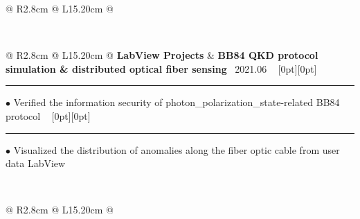 {{\begin{tabularx}{\linewidth}{@{} R{2.8cm} @{\phantom{d}} L{15.20cm} @{}}
\end{tabularx}
\\
\begin{tabularx}{\linewidth}{@{} R{2.8cm} @{\phantom{d}} L{15.20cm} @{}}
	\textbf{LabView Projects} & \hspace{9pt} \textbf{BB84 QKD protocol simulation \& distributed optical fiber sensing} \hfill \textendash\ 2021.06 \newline \vspace{2pt} \ \hspace{-3pt} \raisebox{0.09\height}[0pt][0pt]{\vrule width0.5pt height30.0pt} \hspace{-0.30em}\rule[0.25em]{1.0em}{0.5pt}\!\! $\bullet$ {\small Verified the information security of photon\_polarization\_state-related BB84 protocol} \hfill \href{https://github.com/ChenZhu-Xie/postgraduate_courses/tree/master/3__2.2__Engineering_Course/2__2.2__Information_Technology_\%E2\%86\%90_RoamEdit\%2BLabView__1.0_year/\%E6\%88\%91\%E7\%9A\%84\%E8\%AF\%BE\%E8\%AE\%BE}{\color{black!50}\faGithub} \newline \vspace{-3pt} \ \hspace{-3pt} \raisebox{0.18\height}[0pt][0pt]{\vrule width0.5pt height14.5pt} \hspace{-0.30em}\rule[0.25em]{1.0em}{0.5pt}\!\! $\bullet$ {\small Visualized the distribution of anomalies along the fiber optic cable from user data} \hfill {\small \color{color-detail} LabView} \href{https://github.com/ChenZhu-Xie/postgraduate_courses/tree/master/3__2.2__Engineering_Course/3__2.3__Labview__1.0_year/\%E8\%99\%9A\%E6\%8B\%9F\%E4\%BB\%AA\%E5\%99\%A82021\%E8\%AF\%BE\%E8\%AE\%BE_\%E9\%80\%89\%E9\%A2\%98\%E4\%B8\%80_\%E8\%B0\%A2\%E5\%B0\%98\%E7\%AB\%B9}{\color{black!50}\faGithub} \\ \Gap\Gap\Gap
\end{tabularx}
\\
\begin{tabularx}{\linewidth}{@{} R{2.8cm} @{\phantom{d}} L{15.20cm} @{}}

\end{tabularx}}}
